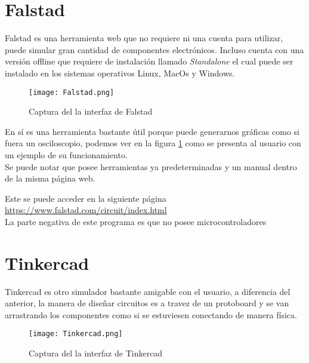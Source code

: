\documentclass[11pt]{report}
\theoremstyle{plain}
\theoremstyle{definition}
\begin{document}

\section{Falstad}

Falstad es una herramienta web que no requiere ni una cuenta para utilizar, puede simular gran cantidad de componentes electrónicos. Incluso cuenta con una versión offline que requiere de instalación llamado \textit{Standalone} el cual puede ser instalado en los sistemas operativos Linux, MacOs y Windows.\\


\begin{figure}[!h] %
	\centering
	\texttt{[image: Falstad.png]}
	\caption{Captura del la interfaz de Falstad}
	\label{fig:Falstad}
\end{figure}



En sí es una herramienta bastante útil porque puede generarnos gráficas como si fuera un osciloscopio, podemos ver en la figura \ref{fig:Falstad} como se presenta al usuario con un ejemplo de su funcionamiento.\\
Se puede notar que posee herramientas ya predeterminadas y un manual dentro de la misma página web.


Este se puede acceder en la siguiente página \url{https://www.falstad.com/circuit/index.html}\\

La parte negativa de este programa es que no posee microcontroladores 


\section{Tinkercad}

Tinkercad es otro simulador bastante amigable con el usuario, a diferencia del anterior, la manera de diseñar circuitos es a travez de un protoboard y se van arrastrando los componentes como si se estuviesen conectando de manera física.\\

\begin{figure}[!h] %
	\centering
	\texttt{[image: Tinkercad.png]}
	\caption{Captura del la interfaz de Tinkercad}
	\label{fig:Tinkercad}
\end{figure}
\end{document}
